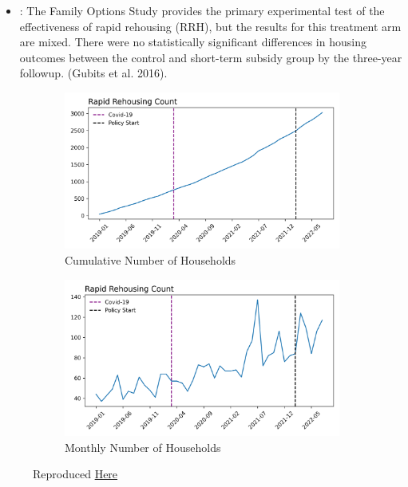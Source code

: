 \documentclass[a4paper,12pt]{article}
\begin{document}
\begin{itemize}
    \item \cite{evans2019reducing}: The Family Options Study provides the primary experimental test of the effectiveness of rapid rehousing (RRH), but the results for this treatment arm are mixed. There were no statistically significant
differences in housing outcomes between the control and short-term subsidy group by the three-year followup. (Gubits et al. 2016).
\end{itemize}
\begin{figure}[htbp]
\centering
\begin{subfigure}{.48\textwidth}
    \centering
    \includegraphics[width=.95\linewidth]{figures/rtc/context/rrh_counts_True.png}
    \caption{Cumulative Number of Households}
    \label{fig:efr}
\end{subfigure}
\begin{subfigure}{.48\textwidth}
    \centering
    \includegraphics[width=.95\linewidth]{figures/rtc/context/rrh_counts_False.png}
    \caption{Monthly Number of Households}
    \label{fig:treated_areas}
\end{subfigure}
\caption{Reproduced \href{https://github.com/pharringtonp19/evictions/blob/main/scripts/cceh/plot/summary_rrh.py}{Here}}
\end{figure}
\end{document}
